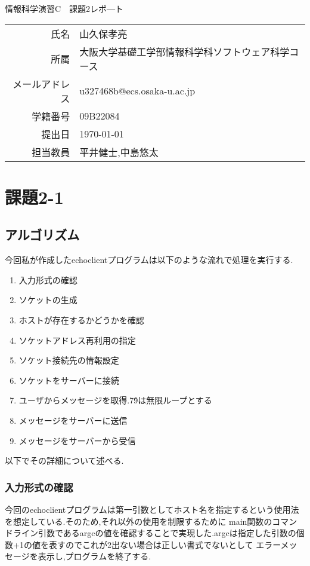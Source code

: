 \documentclass[dvipdfmx]{jarticle}
\begin{document}
\begin{titlepage}
    \begin{center}
        {\huge 情報科学演習C　課題2レポ―ト}
        \vspace{180pt}\\
        \begin{tabular}{rl}
            氏名 & 山久保孝亮\\
            所属 & 大阪大学基礎工学部情報科学科ソフトウェア科学コース\\
            メールアドレス & u327468b@ecs.osaka-u.ac.jp\\
            学籍番号 & 09B22084\\
            提出日 & \today\\
            担当教員 & 平井健士,中島悠太
        \end{tabular}
    \end{center}
\end{titlepage}
\section{課題2-1}
\subsection{アルゴリズム}
今回私が作成したechoclientプログラムは以下のような流れで処理を実行する.

\begin{enumerate}
    \item 入力形式の確認
    \item ソケットの生成
    \item ホストが存在するかどうかを確認
    \item ソケットアドレス再利用の指定
    \item ソケット接続先の情報設定
    \item ソケットをサーバーに接続
    \item ユーザからメッセージを取得.7\~9は無限ループとする
    \item メッセージをサーバーに送信
    \item メッセージをサーバーから受信
\end{enumerate}
以下でその詳細について述べる.
\subsubsection{入力形式の確認}
今回のechoclientプログラムは第一引数としてホスト名を指定するという使用法を想定している.そのため,それ以外の使用を制限するために
main関数のコマンドライン引数であるargcの値を確認することで実現した.argcは指定した引数の個数+1の値を表すのでこれが2出ない場合は正しい書式でないとして
エラーメッセージを表示し,プログラムを終了する.
\end{document}
